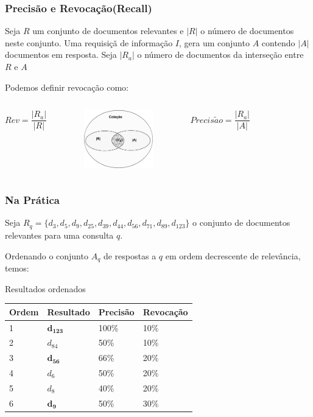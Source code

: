 \documentclass[compress]{beamer}
\begin{document}
\begin{frame}[fragile]
\frametitle{Precisão e Revocação(Recall)}
Seja $R$ um conjunto de documentos relevantes e $|R|$ o número de documentos neste conjunto. Uma requisiçã de informação $I$, gera um conjunto $A$ contendo $|A|$ documentos em resposta. Seja $|R_a|$ o número de documentos da interseção entre $R$ e $A$

Podemos definir revocação como:

\begin{columns}
 \column{3cm}
  \begin{equation*}
  Rev = \frac{|R_a|}{|R|}
  \end{equation*}
  \column{3cm}
  \begin{figure}[h!]
    \includegraphics[width=3cm]{./recall.pdf}
  \end{figure}
\column{4cm}
  \begin{equation*}
    Precis\tilde{a}o = \frac{|R_a|}{|A|}
  \end{equation*} 
\end{columns}
\end{frame}

\begin{frame}%
\frametitle{Na Prática}
Seja $R_q = \{d_3,d_5,d_9,d_{25},d_{39},d_{44},d_{56},d_{71},d_{89},d_{123}\}$ o conjunto de documentos relevantes para uma consulta $q$.

Ordenando o conjunto $A_q$ de respostas a $q$ em ordem decrescente de relevância, temos:

\begin{block}{Resultados ordenados}
\begin{tabular*}{}{llll}
\hline
Ordem & Resultado & Precisão & Revocação\\\hline
1 & $\mathbf{d_{123}}$ & 100\% & 10\%\\
2 & $d_{84}$ & 50\% & 10\%\\\hline
3 & $\mathbf{d_{56}}$ & 66\% & 20\%\\
4 & $d_6$ & 50\% & 20\%\\
5 & $d_8$ & 40\% & 20\%\\
6 & $\mathbf{d_9}$ & 50\% & 30\%\\
\end{tabular*}
\end{block}
\end{frame}
\end{document}
